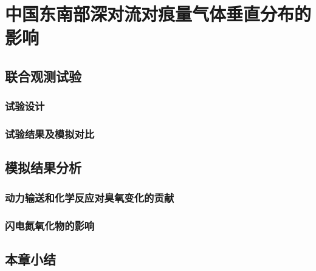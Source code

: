 \chapter{中国东南部深对流对痕量气体垂直分布的影响}

\section{联合观测试验}

\subsection{试验设计}
\subsection{试验结果及模拟对比}

\section{模拟结果分析}

\subsection{动力输送和化学反应对臭氧变化的贡献}
\subsection{闪电氮氧化物的影响}

\section{本章小结}
